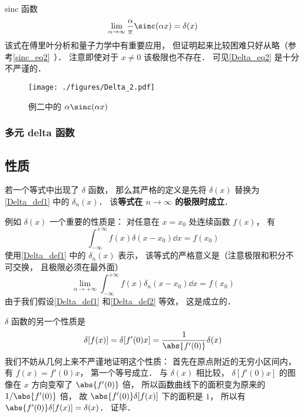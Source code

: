 \begin{example}{sinc 函数}\label{Delta_ex2}
\begin{equation}\label{Delta_eq10}
\lim_{\alpha\to\infty}\frac{\alpha}{\pi}\sinc(\alpha x) = \delta(x)
\end{equation}
该式在傅里叶分析和量子力学中有重要应用\cite{Arfken}， 但证明起来比较困难只好从略（参考\autoref{sinc_eq2}~）． 注意即使对于 $x \ne 0$ 该极限也不存在． 可见\autoref{Delta_eq2} 是十分不严谨的．
\end{example}
\begin{figure}[ht]
\centering
\texttt{[image: ./figures/Delta\_2.pdf]}
\caption{例二中的 $\alpha\sinc(\alpha x)$} \label{Delta_fig2}
\end{figure}

\subsubsection{多元 delta 函数}

\subsection{性质}
若一个等式中出现了 $\delta$ 函数， 那么其严格的定义是先将 $\delta(x)$ 替换为\autoref{Delta_def1} 中的 $\delta_n(x)$． 该\textbf{等式在 $n\to\infty$ 的极限时成立}．

例如 $\delta(x)$ 一个重要的性质是： 对任意在 $x = x_0$ 处连续函数 $f(x)$， 有
\begin{equation}\label{Delta_eq7}
\int_{-\infty}^{+\infty} f(x) \delta(x - x_0) \dd{x}= f(x_0)
\end{equation}
使用\autoref{Delta_def1} 中的 $\delta_n(x)$ 表示， 该等式的严格意义是（注意极限和积分不可交换， 且极限必须在最外面）
\begin{equation}\label{Delta_eq11}
\lim_{\alpha\to+\infty}\int_{-\infty}^{+\infty} f(x) \delta_n(x - x_0) \dd{x}= f(x_0)
\end{equation}
由于我们假设\autoref{Delta_def1} 和\autoref{Delta_def2} 等效， 这是成立的．

$\delta$ 函数的另一个性质是
\begin{equation}
\delta[f(x)] = \delta[f'(0)x] = \frac{1}{\abs{f'(0)}} \delta(x)
\end{equation}
我们不妨从几何上来不严谨地证明这个性质： 首先在原点附近的无穷小区间内， 有 $f(x) = f'(0)x$， 第一个等号成立． 与 $\delta(x)$ 相比较， $\delta[f'(0)x]$ 的图像在 $x$ 方向变窄了 $\abs{f'(0)}$ 倍， 所以函数曲线下的面积变为原来的 $1/\abs{f'(0)}$ 倍， 故 $\abs{f'(0)}\delta[f(x)]$ 下的面积是 $1$， 所以有 $\abs{f'(0)}\delta[f(x)] = \delta(x)$． 证毕．

